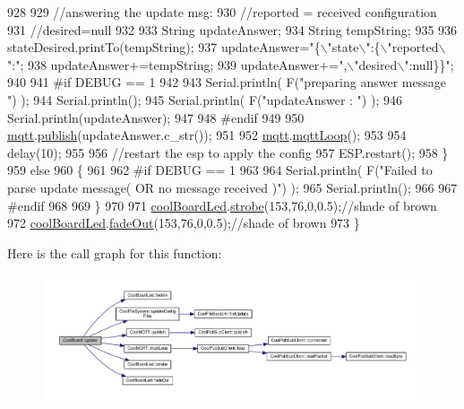 \begin{DoxyCode}
928 
929                 \textcolor{comment}{//answering the update msg:}
930             \textcolor{comment}{//reported = received configuration}
931             \textcolor{comment}{//desired=null}
932         
933             String updateAnswer;
934             String tempString;
935             
936             stateDesired.printTo(tempString);
937             updateAnswer=\textcolor{stringliteral}{"\{\(\backslash\)"state\(\backslash\)":\{\(\backslash\)"reported\(\backslash\)":"};
938             updateAnswer+=tempString;
939             updateAnswer+=\textcolor{stringliteral}{",\(\backslash\)"desired\(\backslash\)":null\}\}"};
940 
941 \textcolor{preprocessor}{        #if DEBUG == 1}
942 
943             Serial.println( F(\textcolor{stringliteral}{"preparing answer message "}) );
944             Serial.println();
945             Serial.println( F(\textcolor{stringliteral}{"updateAnswer : "}) );
946             Serial.println(updateAnswer);
947         
948 \textcolor{preprocessor}{        #endif  }
949 
950             \hyperlink{class_cool_board_a2399f44d7c23c1149a335cb3b46d90f1}{mqtt}.\hyperlink{class_cool_m_q_t_t_ace977b3e90ab14b1199fe5c4fb0a13ec}{publish}(updateAnswer.c\_str());
951             
952             \hyperlink{class_cool_board_a2399f44d7c23c1149a335cb3b46d90f1}{mqtt}.\hyperlink{class_cool_m_q_t_t_aa5eaae967b562b62cbcf2b8d81f6e5d5}{mqttLoop}();
953 
954             delay(10);
955             
956             \textcolor{comment}{//restart the esp to apply the config}
957             ESP.restart();
958     \}
959     \textcolor{keywordflow}{else}
960     \{
961     
962 \textcolor{preprocessor}{    #if DEBUG == 1}
963 
964         Serial.println( F(\textcolor{stringliteral}{"Failed to parse update message( OR no message received )"}) );
965         Serial.println();
966     
967 \textcolor{preprocessor}{    #endif}
968     
969     \}
970 
971     \hyperlink{class_cool_board_a1b1d3c684a5baa56b08486e192fd8e97}{coolBoardLed}.\hyperlink{class_cool_board_led_ad5f0de4c628cbfbf49896042831c64ad}{strobe}(153,76,0,0.5);\textcolor{comment}{//shade of brown}
972     \hyperlink{class_cool_board_a1b1d3c684a5baa56b08486e192fd8e97}{coolBoardLed}.\hyperlink{class_cool_board_led_a93d545679237e8cc858324367149775c}{fadeOut}(153,76,0,0.5);\textcolor{comment}{//shade of brown                              }
973 \}
\end{DoxyCode}
Here is the call graph for this function\+:\nopagebreak
\begin{figure}[H]
\begin{center}
\leavevmode
\includegraphics[width=350pt]{d7/df9/class_cool_board_a8612756d3f73198cdde857a66f0fe690_cgraph}
\end{center}
\end{figure}
